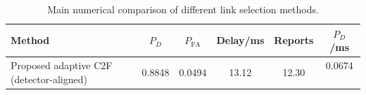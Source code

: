 \begin{table}[t]
    \centering
    \caption{Main numerical comparison of different link selection methods.}
    \label{tab:main_summary}
    \begin{tabular}{l c c c c c}
        \hline
        Method & $P_D$ & $P_{\mathrm{FA}}$ & Delay/ms & Reports & $P_D$/ms \\
        \hline
        Proposed adaptive C2F (detector-aligned) & 0.8848 & 0.0494 & 13.12 & 12.30 & 0.0674 \
        \hline
    \end{tabular}
\end{table}
